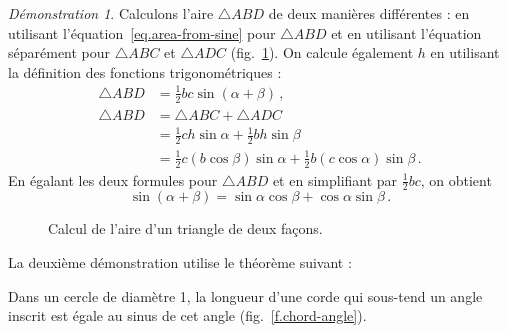 \noindent \emph{Démonstration 1}. 
Calculons l'aire  $\triangle ABD$ de deux manières différentes :  en utilisant l'équation~\ref{eq.area-from-sine} pour $\triangle ABD$ et  en utilisant l'équation séparément pour $\triangle ABC$ et $\triangle ADC$ (fig.~\ref{f.sin-sum2}).
On calcule également  $h$ en utilisant la définition des fonctions trigonométriques :
\begin{align*}
\triangle ABD &= \frac{1}{2}bc\sin(\alpha+\beta)\,,\\
\triangle ABD &= \triangle ABC+\triangle ADC\\
&= \frac{1}{2}ch\sin \alpha + \frac{1}{2}bh\sin \beta\\
&= \frac{1}{2}c(b\cos\beta)\sin \alpha + \frac{1}{2}b(c\cos\alpha)\sin \beta\,.
\end{align*}
En égalant les deux formules pour $\triangle ABD$ et en simplifiant par $\frac{1}{2}bc$, on obtient 
\[
\sin(\alpha+\beta)=\sin\alpha\cos\beta+\cos \alpha\sin\beta\,.   \tag*{\qed}
\]



\begin{figure}[htbp]
\centering

\caption{Calcul de l'aire d'un triangle de deux façons.}\label{f.sin-sum2}
\end{figure}

\enlargethispage{\baselineskip}

La deuxième démonstration utilise le théorème suivant :
\begin{theorem}
Dans un cercle de diamètre 1, la longueur d'une corde qui sous-tend un angle inscrit est égale au sinus de cet angle (fig.~\ref{f.chord-angle}).
\end{theorem}

